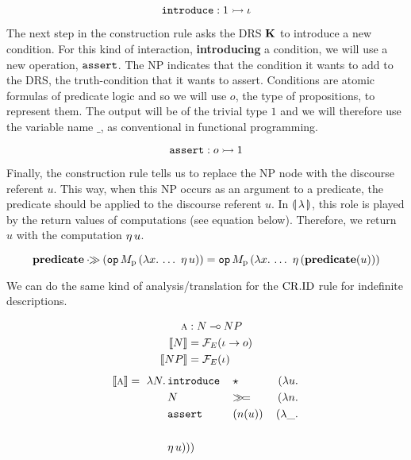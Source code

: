 $$
\mathtt{introduce} : 1 \rightarrowtail \iota
$$

The next step in the construction rule asks the DRS $\mathbf{K}$ to introduce a
new condition. For this kind of interaction, \textbf{introducing} a
condition, we will use a new operation, $\mathtt{assert}$. The NP indicates
that the condition it wants to add to the DRS, the truth-condition that it
wants to assert. Conditions are atomic formulas of predicate logic and so
we will use $o$, the type of propositions, to represent them. The output
will be of the trivial type $1$ and we will therefore use the variable name
$\_$, as conventional in functional programming.

$$
\mathtt{assert} : o \rightarrowtail 1
$$

Finally, the construction rule tells us to replace the NP node with the
discourse referent $u$. This way, when this NP occurs as an argument to a
predicate, the predicate should be applied to the discourse referent
$u$. In $\llparenthesis \, \lambda \, \rrparenthesis$, this role is played by the return values of
computations (see equation below). Therefore, we return $u$ with the
computation $\eta\,u$.

$$
\textbf{predicate} \mathbin{\cdot\!\!\gg} (\mathtt{op}\,M_{\mathrm{p}}\,(\lambda x.\,  \ldots\
    \eta\,u)) = \mathtt{op}\,M_{\mathrm{p}}\,(\lambda x.\,  \ldots\
    \eta\,(\textbf{predicate}(u)))
$$

We can do the same kind of analysis/translation for the $\mathrm{CR.ID}$ rule for
indefinite descriptions.

\vspace{3mm}

\begin{minipage}{0.72\textwidth}
\cridbox
\end{minipage}
\begin{minipage}{0.27\textwidth}
\vspace{0.3cm}
\begin{align*}
\textsc{a} &: N \mathbin{{-}\mkern-3.5mu{\circ}} NP \\
\llbracket N \rrbracket &= \mathcal{F}_E(\iota \to o) \\
\llbracket NP \rrbracket &= \mathcal{F}_E(\iota)
\end{align*}
\begin{align*}
\llbracket \textsc{a} \rrbracket =\ \lambda N.\, & \mathtt{introduce}\,&&\star\, &(\lambda u.\,  \\
                         & N &&\mathbin{\gg\!=} &(\lambda n.\,  \\
                         & \mathtt{assert}\,&&(n(u))\, &(\lambda \_.\,  \\
                         \\
                         & \eta\,u)))
\end{align*}
\end{minipage}

